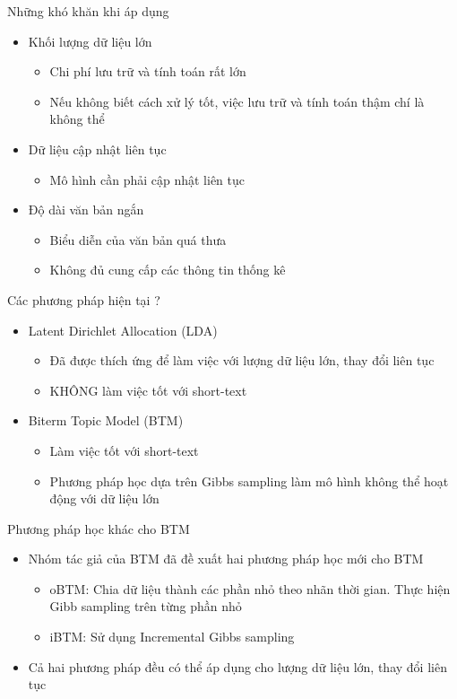 \documentclass[pdf]{beamer}
\begin{document}
\begin{frame}{Những khó khăn khi áp dụng}
	\begin{itemize}
		\item Khối lượng dữ liệu lớn
			\begin{itemize}
				\item Chi phí lưu trữ và tính toán rất lớn
				\item Nếu không biết cách xử lý tốt, việc lưu trữ và tính toán thậm chí là không thể
			\end{itemize}
		\item Dữ liệu cập nhật liên tục
			\begin{itemize}
				\item Mô hình cần phải cập nhật liên tục
			\end{itemize}
		\item Độ dài văn bản ngắn
			\begin{itemize}
				\item Biểu diễn của văn bản quá thưa
				\item Không đủ cung cấp các thông tin thống kê
			\end{itemize}
	\end{itemize}
\end{frame}

\begin{frame}{Các phương pháp hiện tại ?}
	\begin{itemize}
		\item Latent Dirichlet Allocation (LDA)
			\begin{itemize}
				\item Đã được thích ứng để làm việc với lượng dữ liệu lớn, thay đổi liên tục
				\item KHÔNG làm việc tốt với short-text
			\end{itemize}
		\item Biterm Topic Model (BTM)
			\begin{itemize}
				\item Làm việc tốt với short-text 
				\item Phương pháp học dựa trên Gibbs sampling làm mô hình không thể hoạt động với dữ liệu lớn
			\end{itemize}
	\end{itemize}
\end{frame}

\begin{frame}{Phương pháp học khác cho BTM}
	\begin{itemize}
		\item Nhóm tác giả của BTM đã đề xuất hai phương pháp học mới cho BTM
			\begin{itemize}
				\item oBTM: Chia dữ liệu thành các phần nhỏ theo nhãn thời gian. Thực hiện Gibb sampling trên từng phần nhỏ
				\item iBTM: Sử dụng Incremental Gibbs sampling
			\end{itemize}
		\item Cả hai phương pháp đều có thể áp dụng cho lượng dữ liệu lớn, thay đổi liên tục
	\end{itemize}
\end{frame}
\end{document}
